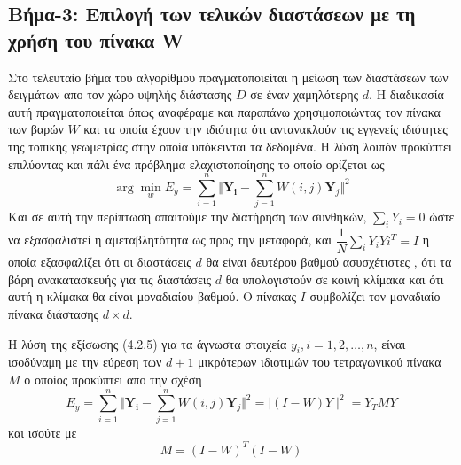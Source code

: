 \subsection{Βήμα-3: Επιλογή των τελικών διαστάσεων με τη χρήση του πίνακα \textlatin{W}}
\par
Στο τελευταίο βήμα του αλγορίθμου πραγματοποιείται η μείωση των διαστάσεων των δειγμάτων απο τον χώρο υψηλής διάστασης $D$ σε έναν χαμηλότερης $d$. Η διαδικασία αυτή πραγματοποιείται όπως αναφέραμε και παραπάνω χρησιμοποιώντας τον πίνακα των βαρών $W$ και τα οποία έχουν την ιδιότητα ότι αντανακλούν τις εγγενείς ιδιότητες της τοπικής γεωμετρίας στην οποία υπόκεινται τα δεδομένα. Η λύση λοιπόν προκύπτει επιλύοντας και πάλι ένα πρόβλημα ελαχιστοποίησης το οποίο ορίζεται ως
\newline\hspace*{\fill}
\begin{equation}
        \arg \min_{w} E_{y} = \sum_{i=1}^{n} \Vert \mathbf{Y_{i}} - \sum_{j=1}^{n} W(i,j)\mathbf{Y}_{j} \Vert ^{2}
\end{equation}
\hspace*{\fill}\newline
Και σε αυτή την περίπτωση  απαιτούμε την διατήρηση των συνθηκών, $\sum_{i} Y_{i} = 0$ ώστε να εξασφαλιστεί η αμεταβλητότητα ως προς την μεταφορά, και $ \dfrac{1}{N} \sum_{i} Y_{i}Y{i}^{T} = I $ η οποία εξασφαλίζει ότι οι διαστάσεις $d$ θα είναι δευτέρου βαθμού ασυσχέτιστες , ότι τα βάρη ανακατασκευής για τις διαστάσεις $d$ θα υπολογιστούν σε κοινή κλίμακα και ότι αυτή η κλίμακα θα είναι μοναδιαίου βαθμού. Ο πίνακας $I$ συμβολίζει τον μοναδιαίο πίνακα διάστασης $d \times d$. 
\par
Η λύση της εξίσωσης (4.2.5) για τα άγνωστα στοιχεία $y_{i},i=1,2,\ldots,n$, είναι ισοδύναμη με την εύρεση των $d+1$ μικρότερων ιδιοτιμών του τετραγωνικού πίνακα $M$ ο οποίος προκύπτει απο την σχέση
\newline\hspace*{\fill}
\begin{equation}
        E_{y} = \sum_{i=1}^{n} \Vert \mathbf{Y_{i}} - \sum_{j=1}^{n} W(i,j)\mathbf{Y}_{j} \Vert ^{2} = \mid (I-W)Y \mid ^{2} = Y_{T}MY
\end{equation}
\hspace*{\fill}\newline
και ισούτε με
\begin{equation}
        M = (I-W)^{T}(I-W)
\end{equation}
\hspace*{\fill}\newline
